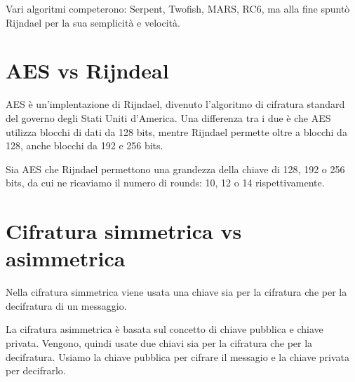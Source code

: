     

\textsf{\small Vari algoritmi competerono: Serpent, Twofish, MARS, RC6, ma alla fine spuntò Rijndael per la sua semplicità e velocità.} %



\section{AES vs Rijndeal}

 

\textsf{\small AES è un'implentazione di Rijndael, divenuto l'algoritmo di cifratura standard del governo degli Stati Uniti d'America.}
\textsf{\small Una differenza tra i due è che AES utilizza blocchi di dati da 128 bits, mentre Rijndael permette oltre a blocchi da 128, anche blocchi da 192 e 256 bits.} %

 

\textsf{\small Sia AES che Rijndael permettono una grandezza della chiave di 128, 192 o 256 bits, da cui ne ricaviamo il numero di rounds: 10, 12 o 14 rispettivamente.}



\section{Cifratura simmetrica vs asimmetrica}

 

\textsf{\small Nella cifratura simmetrica viene usata una chiave sia per la cifratura che per la decifratura di un messaggio.}

 

\textsf{\small La cifratura asimmetrica è basata sul concetto di chiave pubblica e chiave privata. Vengono, quindi usate due chiavi sia per la cifratura che per la decifratura. Usiamo la chiave pubblica per cifrare il messagio e la chiave privata per decifrarlo.} %

